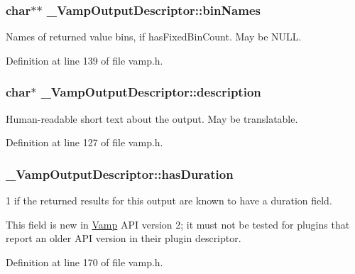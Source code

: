 \subsubsection[{\texorpdfstring{bin\+Names}{binNames}}]{ char$\ast$$\ast$ \+\_\+\+Vamp\+Output\+Descriptor\+::bin\+Names}\hypertarget{struct___vamp_output_descriptor_a10fffaa32bd894843ff7592240dfe447}{}\label{struct___vamp_output_descriptor_a10fffaa32bd894843ff7592240dfe447}
Names of returned value bins, if has\+Fixed\+Bin\+Count. May be N\+U\+LL. 

Definition at line 139 of file vamp.\+h.

\subsubsection[{\texorpdfstring{description}{description}}]{ char$\ast$ \+\_\+\+Vamp\+Output\+Descriptor\+::description}\hypertarget{struct___vamp_output_descriptor_abfa911b138cfb80cf63e8f2e0fa0fb89}{}\label{struct___vamp_output_descriptor_abfa911b138cfb80cf63e8f2e0fa0fb89}
Human-\/readable short text about the output. May be translatable. 

Definition at line 127 of file vamp.\+h.

\subsubsection[{\texorpdfstring{has\+Duration}{hasDuration}}]{ \+\_\+\+Vamp\+Output\+Descriptor\+::has\+Duration}\hypertarget{struct___vamp_output_descriptor_af792a96dbf292ec966b9b68250febd99}{}\label{struct___vamp_output_descriptor_af792a96dbf292ec966b9b68250febd99}
1 if the returned results for this output are known to have a duration field.

This field is new in \hyperlink{namespace_vamp}{Vamp} A\+PI version 2; it must not be tested for plugins that report an older A\+PI version in their plugin descriptor. 

Definition at line 170 of file vamp.\+h.


